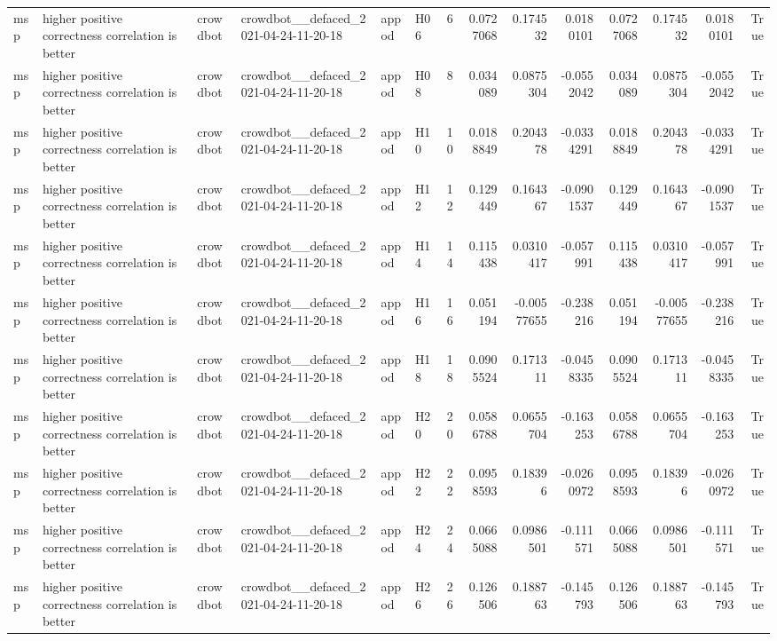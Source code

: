\begin{longtable}{llllllrrrrrrrr}
msp & higher positive correctness correlation is better & crowdbot & crowdbot\_\_defaced\_2021-04-24-11-20-18 & appod & H06 & 6 & 0.0727068 & 0.174532 & 0.0180101 & 0.0727068 & 0.174532 & 0.0180101 & True \\
msp & higher positive correctness correlation is better & crowdbot & crowdbot\_\_defaced\_2021-04-24-11-20-18 & appod & H08 & 8 & 0.034089 & 0.0875304 & -0.0552042 & 0.034089 & 0.0875304 & -0.0552042 & True \\
msp & higher positive correctness correlation is better & crowdbot & crowdbot\_\_defaced\_2021-04-24-11-20-18 & appod & H10 & 10 & 0.0188849 & 0.204378 & -0.0334291 & 0.0188849 & 0.204378 & -0.0334291 & True \\
msp & higher positive correctness correlation is better & crowdbot & crowdbot\_\_defaced\_2021-04-24-11-20-18 & appod & H12 & 12 & 0.129449 & 0.164367 & -0.0901537 & 0.129449 & 0.164367 & -0.0901537 & True \\
msp & higher positive correctness correlation is better & crowdbot & crowdbot\_\_defaced\_2021-04-24-11-20-18 & appod & H14 & 14 & 0.115438 & 0.0310417 & -0.057991 & 0.115438 & 0.0310417 & -0.057991 & True \\
msp & higher positive correctness correlation is better & crowdbot & crowdbot\_\_defaced\_2021-04-24-11-20-18 & appod & H16 & 16 & 0.051194 & -0.00577655 & -0.238216 & 0.051194 & -0.00577655 & -0.238216 & True \\
msp & higher positive correctness correlation is better & crowdbot & crowdbot\_\_defaced\_2021-04-24-11-20-18 & appod & H18 & 18 & 0.0905524 & 0.171311 & -0.0458335 & 0.0905524 & 0.171311 & -0.0458335 & True \\
msp & higher positive correctness correlation is better & crowdbot & crowdbot\_\_defaced\_2021-04-24-11-20-18 & appod & H20 & 20 & 0.0586788 & 0.0655704 & -0.163253 & 0.0586788 & 0.0655704 & -0.163253 & True \\
msp & higher positive correctness correlation is better & crowdbot & crowdbot\_\_defaced\_2021-04-24-11-20-18 & appod & H22 & 22 & 0.0958593 & 0.18396 & -0.0260972 & 0.0958593 & 0.18396 & -0.0260972 & True \\
msp & higher positive correctness correlation is better & crowdbot & crowdbot\_\_defaced\_2021-04-24-11-20-18 & appod & H24 & 24 & 0.0665088 & 0.0986501 & -0.111571 & 0.0665088 & 0.0986501 & -0.111571 & True \\
msp & higher positive correctness correlation is better & crowdbot & crowdbot\_\_defaced\_2021-04-24-11-20-18 & appod & H26 & 26 & 0.126506 & 0.188763 & -0.145793 & 0.126506 & 0.188763 & -0.145793 & True \\

\end{longtable}

